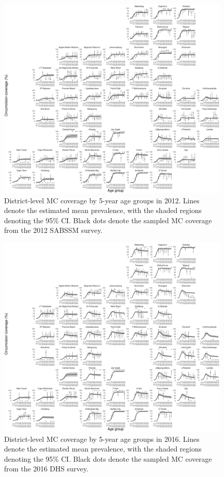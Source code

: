 \documentclass{article}
\begin{document}
\begin{appendix}
\begin{figure}[H]
	\centering
	\includegraphics[width = \linewidth]{Figures/suppmat/ModelFit/TotalPrev_5year_District_2012_withsurveypoints}
	\caption{District-level MC coverage by 5-year age groups in 2012. Lines denote the estimated mean prevalence, with the shaded regions denoting the 95\% CI. Black dots denote the sampled MC coverage from the 2012 SABSSM survey.}
\end{figure}


\begin{figure}[H]
	\centering
	\includegraphics[width = \linewidth]{Figures/suppmat/ModelFit/TotalPrev_5year_District_2016_withsurveypoints}
	\caption{District-level MC coverage by 5-year age groups in 2016. Lines denote the estimated mean prevalence, with the shaded regions denoting the 95\% CI. Black dots denote the sampled MC coverage from the 2016 DHS survey.}
\end{figure}


\end{appendix}
\end{document}
